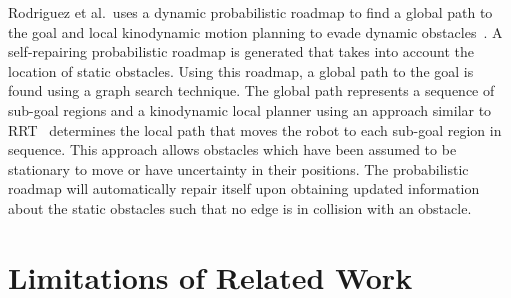 Rodriguez et al.\ uses a dynamic probabilistic roadmap to find a global path to
the goal and local kinodynamic motion planning to evade dynamic
obstacles~\cite{rodriguez2007framework}. A self-repairing probabilistic roadmap
is generated that takes into account the location of static obstacles. Using
this roadmap, a global path to the goal is found using a graph search
technique. The global path represents a sequence of sub-goal regions and a
kinodynamic local planner using an approach similar to RRT~\cite{rrt}
determines the local path that moves the robot to each sub-goal region in
sequence. This approach allows obstacles which have been assumed to be
stationary to move or have uncertainty in their positions. The probabilistic
roadmap will automatically repair itself upon obtaining updated information
about the static obstacles such that no edge is in collision with an obstacle.

\section{Limitations of Related Work}

